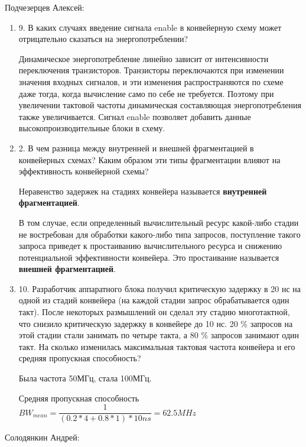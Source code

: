 \documentclass[a4paper,14pt]{article}
\begin{document}
	Подчезерцев Алексей:
	
	\begin{enumerate}
		\item 9. В каких случаях введение сигнала enable в конвейерную схему может отрицательно сказаться на энергопотреблении? 
		
		Динамическое энергопотребление линейно зависит от интенсивности переключения транзисторов.
		Транзисторы переключаются при изменении значения входных сигналов, и эти
		изменения распространяются по схеме даже тогда, когда вычисление само по себе не
		требуется. Поэтому при увеличении тактовой частоты динамическая составляющая
		энергопотребления также увеличивается. Сигнал enable позволяет добавить данные высокопроизводительные блоки в схему.
	
		\item 2. В чем разница между внутренней и внешней фрагментацией в конвейерных схемах?
		Каким образом эти типы фрагментации влияют на эффективность конвейерной	схемы?
		
		Неравенство задержек на стадиях конвейера называется \textbf{внутренней фрагментацией}.
		
		В том случае, если определенный вычислительный ресурс какой-либо стадии не востребован для
		обработки какого-либо типа запросов, поступление такого запроса приведет к простаиванию вычислительного
		ресурса и снижению потенциальной эффективности конвейера. Это простаивание
		называется \textbf{внешней фрагментацией}.
		
		\item 10. Разработчик аппаратного блока получил критическую задержку в 20 нс на одной из стадий конвейера (на каждой стадии запрос обрабатывается один такт). После некоторых размышлений он сделал эту стадию многотактной, что снизило критическую задержку в конвейере до 10 нс. 20 \% запросов на этой стадии стали занимать по четыре такта, а 80 \% запросов занимают один такт. На сколько	изменилась максимальная тактовая частота конвейера и его средняя пропускная способность?
		
		Была частота 50МГц, стала 100МГц.
		
		Средняя пропускная способность $BW_{mean} =  \dfrac{1}{(0.2 * 4 + 0.8 * 1) * 10ns} = 62.5MHz$

	\end{enumerate}
	
	Солодянкин Андрей:
\end{document}
